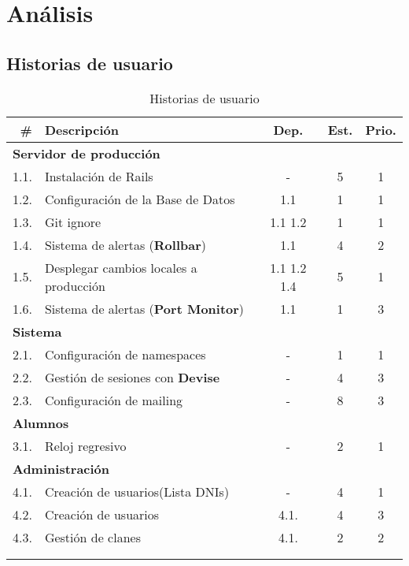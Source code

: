 \setcounter{chapter}{7}
\setcounter{section}{0}
\setcounter{subsection}{0}
\chapter{Análisis}
\section{Historias de usuario}

\begin{longtable} {r l c c c}
	\hline
	\#	&	\textbf{Descripción}					&	\textbf{Dep.}	&	\textbf{Est.}	&	\textbf{Prio.}	\\
	\hline \hline
	\endhead
	\multicolumn{5}{l}{\textbf{Servidor de producción}} \\
	\hline 
	1.1.	&	Instalación de Rails				&	-				&	5				&	1	\\
	\hline
	1.2.	&	Configuración de la Base de Datos	&	1.1				&	1				&	1	\\
	\hline
	1.3.	&	Git ignore							&	1.1	1.2			&	1				&	1	\\
	\hline	
	1.4.	&	Sistema de alertas (\textbf{Rollbar})&	1.1				&	4				&	2	\\
	\hline	
	1.5.	&	Desplegar cambios locales a producción&	1.1	1.2 1.4		&	5				&	1	\\
	\hline	
	1.6.	&	Sistema de alertas (\textbf{Port Monitor})&	1.1			&	1				&	3	\\
	\hline
	\multicolumn{5}{l}{\textbf{Sistema}} \\
	\hline 
	2.1.	&	Configuración de namespaces				&	-				&	1				&	1	\\
	\hline
	2.2.	&	Gestión de sesiones	con \textbf{Devise}	&	-			&	4				&	3	\\
	\hline
	2.3.	&	Configuración de mailing			&	-				&	8				&	3	\\
	\hline
	\multicolumn{5}{l}{\textbf{Alumnos}} \\
	\hline 
	3.1.	&	Reloj regresivo						&	-				&	2				&	1	\\
	\hline
	\multicolumn{5}{l}{\textbf{Administración}} \\
	\hline 
	4.1.	&	Creación de usuarios(Lista DNIs)	&	-				&	4				&	1	\\
	\hline
	4.2.	&	Creación de usuarios				&	4.1.			&	4				&	3	\\
	\hline
	4.3.	&	Gestión de clanes					&	4.1.			&	2				&	2	\\
	\hline
	\\
	\caption{Historias de usuario}
	\label{tab:analisis/hus}
\end{longtable}

